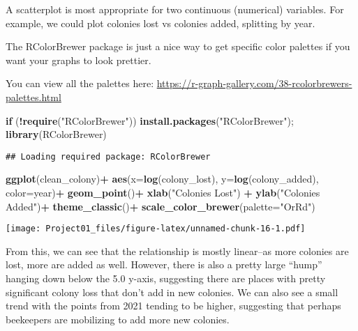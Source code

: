 \documentclass[
]{article}
\newenvironment{Shaded}{\begin{snugshade}}{\end{snugshade}}
\newcommand{\AttributeTok}[1]{\textcolor[rgb]{0.13,0.29,0.53}{#1}}
\newcommand{\ControlFlowTok}[1]{\textcolor[rgb]{0.13,0.29,0.53}{\textbf{#1}}}
\newcommand{\FunctionTok}[1]{\textcolor[rgb]{0.13,0.29,0.53}{\textbf{#1}}}
\newcommand{\NormalTok}[1]{#1}
\newcommand{\SpecialCharTok}[1]{\textcolor[rgb]{0.81,0.36,0.00}{\textbf{#1}}}
\newcommand{\StringTok}[1]{\textcolor[rgb]{0.31,0.60,0.02}{#1}}
\begin{document}
A scatterplot is most appropriate for two continuous (numerical)
variables. For example, we could plot colonies lost vs colonies added,
splitting by year.

The RColorBrewer package is just a nice way to get specific color
palettes if you want your graphs to look prettier.

You can view all the palettes here:
\url{https://r-graph-gallery.com/38-rcolorbrewers-palettes.html}

\begin{Shaded}
\begin{Highlighting}[]
\ControlFlowTok{if}\NormalTok{ (}\SpecialCharTok{!}\FunctionTok{require}\NormalTok{(}\StringTok{"RColorBrewer"}\NormalTok{)) }\FunctionTok{install.packages}\NormalTok{(}\StringTok{"RColorBrewer"}\NormalTok{); }\FunctionTok{library}\NormalTok{(RColorBrewer)}
\end{Highlighting}
\end{Shaded}

\begin{verbatim}
## Loading required package: RColorBrewer
\end{verbatim}

\begin{Shaded}
\begin{Highlighting}[]
\FunctionTok{ggplot}\NormalTok{(clean\_colony)}\SpecialCharTok{+}  
  \FunctionTok{aes}\NormalTok{(}\AttributeTok{x=}\FunctionTok{log}\NormalTok{(colony\_lost), }\AttributeTok{y=}\FunctionTok{log}\NormalTok{(colony\_added), }\AttributeTok{color=}\NormalTok{year)}\SpecialCharTok{+} 
  \FunctionTok{geom\_point}\NormalTok{()}\SpecialCharTok{+} 
  \FunctionTok{xlab}\NormalTok{(}\StringTok{"Colonies Lost"}\NormalTok{) }\SpecialCharTok{+}
  \FunctionTok{ylab}\NormalTok{(}\StringTok{"Colonies Added"}\NormalTok{)}\SpecialCharTok{+}
  \FunctionTok{theme\_classic}\NormalTok{()}\SpecialCharTok{+}
  \FunctionTok{scale\_color\_brewer}\NormalTok{(}\AttributeTok{palette=}\StringTok{"OrRd"}\NormalTok{)}
\end{Highlighting}
\end{Shaded}

\texttt{[image: Project01\_files/figure-latex/unnamed-chunk-16-1.pdf]}

From this, we can see that the relationship is mostly linear--as more
colonies are lost, more are added as well. However, there is also a
pretty large ``hump'' hanging down below the 5.0 y-axis, suggesting
there are places with pretty significant colony loss that don't add in
new colonies. We can also see a small trend with the points from 2021
tending to be higher, suggesting that perhaps beekeepers are mobilizing
to add more new colonies.
\end{document}
